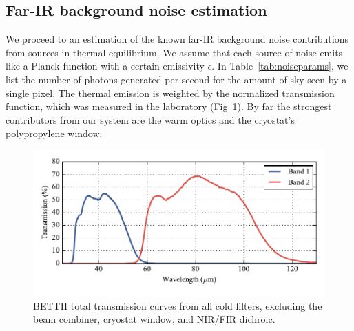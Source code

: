 \subsection{Far-IR background noise estimation}

We proceed to an estimation of the known far-IR background noise contributions from sources in thermal equilibrium. We assume that each source of noise emits like a Planck function \Bnu with a certain emissivity $\epsilon$. In Table~\ref{tab:noiseparams}, we list the number of photons generated per second for the amount of sky seen by a single pixel. The thermal emission is weighted by the normalized transmission function, which was measured in the laboratory (Fig~\ref{fig:BETTIITransmission}). By far the strongest contributors from our system are the warm optics and the cryostat's polypropylene window.
 
\begin{figure}[!h]
	\centering
	\includegraphics[width=\textwidth]{Figures/BETTII_transmission.pdf}
	\vspace{-0.5cm}
	\caption[BETTII Transmission curves]{BETTII total transmission curves from all cold filters, excluding the beam combiner, cryostat window, and NIR/FIR dichroic.}
	\label{fig:BETTIITransmission}
    \end{figure}

